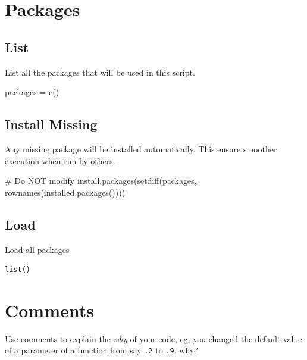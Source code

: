\documentclass[
  letterpaper,
  DIV=11,
  numbers=noendperiod]{scrreprt}
\newenvironment{Shaded}{\begin{snugshade}}{\end{snugshade}}
\newcommand{\CommentTok}[1]{\textcolor[rgb]{0.37,0.37,0.37}{#1}}
\newcommand{\FunctionTok}[1]{\textcolor[rgb]{0.28,0.35,0.67}{#1}}
\newcommand{\NormalTok}[1]{\textcolor[rgb]{0.00,0.23,0.31}{#1}}
\newcommand{\OtherTok}[1]{\textcolor[rgb]{0.00,0.23,0.31}{#1}}
\begin{document}
\section{Packages}\label{sec-packages}

\subsection{List}\label{list-2}

List all the packages that will be used in this script.

\begin{Shaded}
\begin{Highlighting}[]
\NormalTok{packages }\OtherTok{=} \FunctionTok{c}\NormalTok{()}
\end{Highlighting}
\end{Shaded}

\subsection{Install Missing}\label{install-missing-2}

Any missing package will be installed automatically. This ensure
smoother execution when run by others.

\begin{Shaded}
\begin{Highlighting}[]
\CommentTok{\# Do NOT modify}
\FunctionTok{install.packages}\NormalTok{(}\FunctionTok{setdiff}\NormalTok{(packages, }\FunctionTok{rownames}\NormalTok{(}\FunctionTok{installed.packages}\NormalTok{())))}
\end{Highlighting}
\end{Shaded}

\subsection{Load}\label{load-2}

Load all packages

\begin{verbatim}
list()
\end{verbatim}

\section{Comments}\label{comments}

Use comments to explain the \emph{why} of your code, eg, you changed the
default value of a parameter of a function from say \texttt{.2} to
\texttt{.9}, why?
\end{document}
